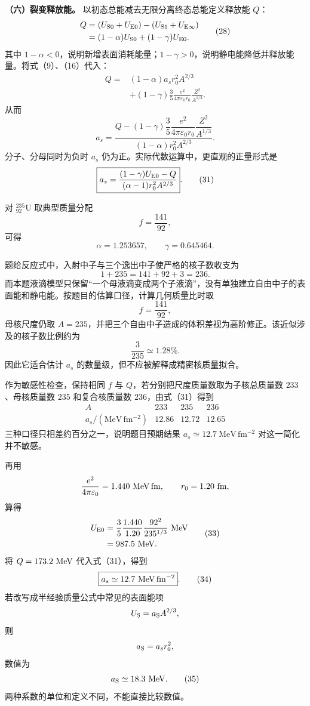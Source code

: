 \documentclass[12pt,a4paper,UTF8]{ctexart}
\begin{document}
\textbf{（六）裂变释放能。} 以初态总能减去无限分离终态总能定义释放能
\(Q\)： \[
\begin{aligned}
Q
&=(U_{\rm S0}+U_{\rm E0})
-(U_{\rm S1}+U_{\rm E\infty})\\
&=(1-\alpha)U_{\rm S0}
+(1-\gamma)U_{\rm E0}.
\end{aligned} \tag{28}
\] 其中
\(1-\alpha<0\)，说明新增表面消耗能量；\(1-\gamma>0\)，说明静电能降低并释放能量。将式（9）、（16）代入：
\[
\begin{aligned}
Q
={}&(1-\alpha)a_sr_0^2A^{2/3}\\
&+(1-\gamma)\frac35
\frac{e^2}{4\pi\varepsilon_0r_0}
\frac{Z^2}{A^{1/3}}.
\end{aligned} \tag{29}
\] 从而 \[
\boxed{
a_s=
\frac{
Q-(1-\gamma)\dfrac35
\dfrac{e^2}{4\pi\varepsilon_0r_0}
\dfrac{Z^2}{A^{1/3}}
}{
(1-\alpha)r_0^2A^{2/3}
}
}. \tag{30}
\] 分子、分母同时为负时 \(a_s\)
仍为正。实际代数运算中，更直观的正量形式是 \[
\boxed{
a_s=
\frac{
(1-\gamma)U_{\rm E0}-Q
}{
(\alpha-1)r_0^2A^{2/3}
}
}. \tag{31}
\]

对 \(^{235}_{92}\mathrm U\) 取典型质量分配 \[
f=\frac{141}{92},
\] 可得 \[
\alpha=1.253657,\qquad
\gamma=0.645464. \tag{32}
\]

题给反应式中，入射中子与三个逸出中子使严格的核子数收支为 \[
1+235=141+92+3=236.
\]
而本题液滴模型只保留``一个母液滴变成两个子液滴''，没有单独建立自由中子的表面能和静电能。按题目的估算口径，计算几何质量比时取
\[
f=\frac{141}{92},
\] 母核尺度仍取
\(A=235\)，并把三个自由中子造成的体积差视为高阶修正。该近似涉及的核子数比例约为
\[
\frac3{235}\simeq1.28\%.
\] 因此它适合估计 \(a_s\) 的数量级，但不应被解释成精密核质量拟合。

作为敏感性检查，保持相同 \(f\) 与
\(Q\)，若分别把尺度质量数取为子核总质量数 \(233\)、母核质量数 \(235\)
和复合核质量数 \(236\)，由式（31）得到 \[
\begin{array}{c|ccc}
A&233&235&236\\ \hline
a_s/(\mathrm{MeV\,fm^{-2}})
&12.86&12.72&12.65
\end{array}
\] 三种口径只相差约百分之一，说明题目预期结果
\(a_s\simeq12.7\ \mathrm{MeV\,fm^{-2}}\) 对这一简化并不敏感。

再用 \[
\frac{e^2}{4\pi\varepsilon_0}=1.440\ {\rm MeV\,fm},
\qquad
r_0=1.20\ {\rm fm},
\] 算得 \[
\begin{aligned}
U_{\rm E0}
&=\frac35\frac{1.440}{1.20}
\frac{92^2}{235^{1/3}}\ {\rm MeV}\\
&=987.5\ {\rm MeV}. 
\end{aligned} \tag{33}
\] 将 \(Q=173.2\ {\rm MeV}\) 代入式（31），得到 \[
\boxed{
a_s\simeq12.7\ {\rm MeV\,fm^{-2}}
}. \tag{34}
\] 若改写成半经验质量公式中常见的表面能项 \[
U_{\rm S}=a_{\rm S}A^{2/3},
\] 则 \[
a_{\rm S}=a_sr_0^2,
\] 数值为 \[
a_{\rm S}\simeq18.3\ {\rm MeV}. \tag{35}
\] 两种系数的单位和定义不同，不能直接比较数值。
\end{document}

